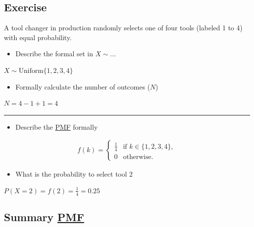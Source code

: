 \documentclass[
  a4paper,
]{scrbook}
\providecommand{\tightlist}{%
  \setlength{\itemsep}{0pt}\setlength{\parskip}{0pt}}\usepackage{longtable,booktabs,array}
\begin{document}
\subsection{Exercise}\label{exercise}

A tool changer in production randomly selects one of four tools (labeled
1 to 4) with equal probability.

\begin{itemize}
\tightlist
\item
  Describe the formal set in \(X \sim ...\)
\end{itemize}

\(X \sim \mathrm{Uniform}\{1,2,3,4\}\)

\begin{itemize}
\tightlist
\item
  Formally calculate the number of outcomes (\(N\))
\end{itemize}

\(N = 4-1+1 = 4\)

\begin{center}\rule{0.5\linewidth}{0.5pt}\end{center}

\begin{itemize}
\tightlist
\item
  Describe the \hyperref[acronyms_PMF]{PMF} formally
\end{itemize}

\begin{align}
f(k) = \begin{cases}
\frac{1}{4} & \text{if } k \in \{1,2,3,4\}, \\
0 & \text{otherwise.}
\end{cases}
\end{align}

\begin{itemize}
\tightlist
\item
  What is the probability to select tool \(2\)
\end{itemize}

\(P(X = 2) = f(2) = \frac{1}{4} = 0.25\)

\subsection{\texorpdfstring{Summary
\hyperref[acronyms_PMF]{PMF}}{Summary PMF}}\label{summary}
\end{document}
